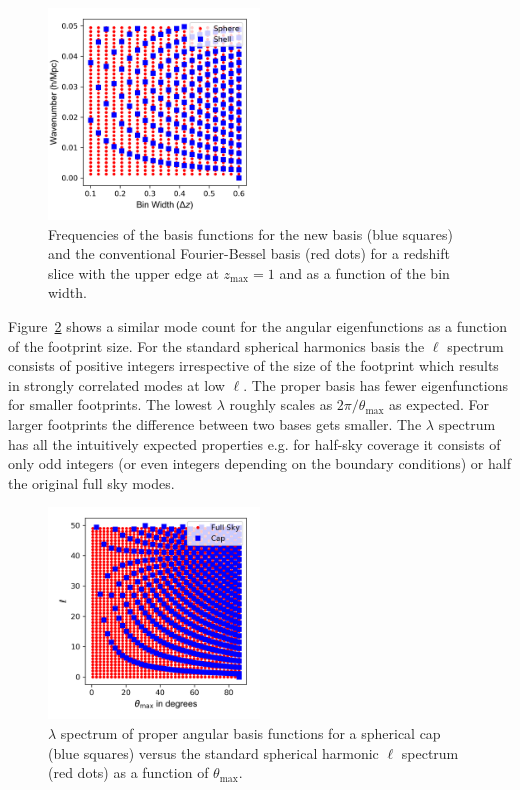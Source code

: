 \documentclass[fleqn,usenatbib]{mnras}
\begin{document}
\begin{figure}
\includegraphics[clip,trim={0 0.5cm 0 0.5cm},width=0.5\textwidth]{modes_comparison.png}
\caption{Frequencies of the basis functions for the new basis (blue squares)
and the conventional Fourier-Bessel basis (red dots) for a redshift slice with
the upper edge at $z_\mathrm{max} = 1$ and as a function of the bin width.}
\label{fig:radmodesnum}
\end{figure}

Figure~\ref{fig:angmodesnum} shows a similar mode count for the angular
eigenfunctions as a function of the footprint size. For the standard spherical
harmonics basis the $\ell$ spectrum consists of positive integers irrespective
of the size of the footprint which results in strongly correlated modes at low
$\ell$. The proper basis has fewer eigenfunctions for smaller footprints. The
lowest $\lambda$ roughly scales as $2\pi/\theta_\mathrm{max}$ as expected. For
larger footprints the difference between two bases gets smaller. The $\lambda$
spectrum has all the intuitively expected properties e.g. for half-sky coverage
it consists of only odd integers (or even integers depending on the boundary
conditions) or half the original full sky modes.

\begin{figure}
\includegraphics[clip, trim={0 0.5cm 0 0.5cm},width=0.5\textwidth]{ell_m_comparison.png}
\caption{$\lambda$ spectrum of proper angular basis functions for a spherical
cap (blue squares) versus the standard spherical harmonic $\ell$ spectrum (red
dots) as a function of $\theta_\mathrm{max}$.}
\label{fig:angmodesnum}
\end{figure}
\end{document}
